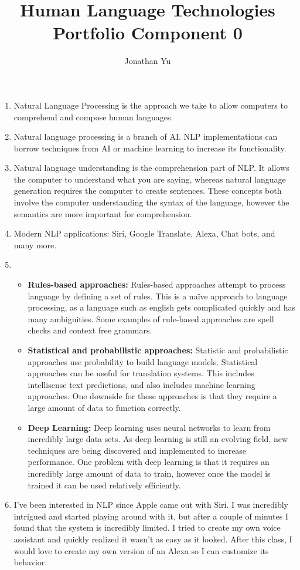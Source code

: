 \documentclass{article}
\title{Human Language Technologies Portfolio Component 0}
\author{Jonathan Yu}
\begin{document}
\renewcommand{\arraystretch}{1.5}
\maketitle
\begin{enumerate}[label=\alph*)]
	\item Natural Language Processing is the approach we take to allow computers to comprehend and compose human languages.

	\item Natural language processing is a branch of AI. NLP implementations can borrow techniques from AI or machine learning to increase its functionality.

	\item Natural language understanding is the comprehension part of NLP. It allows the computer to understand what you are saying, whereas natural language generation requires the computer to create sentences. These concepts both involve the computer understanding the syntax of the language, however the semantics are more important for comprehension.
	
	\item Modern NLP applications: Siri, Google Translate, Alexa, Chat bots, and many more.
	\item \begin{itemize}
		\item \textbf{Rules-based approaches:} Rules-based approaches attempt to process language by defining a set of rules. This is a na\"{i}ve approach to language processing, as a language such as english gets complicated quickly and has many ambiguities. Some examples of rule-based approaches are spell checks and context free grammars.

		\item \textbf{Statistical and probabilistic approaches:} Statistic and probabilistic approaches use probability to build language models. Statistical approaches can be useful for translation systems. This includes intellisense text predictions, and also includes machine learning approaches. One downside for these approaches is that they require a large amount of data to function correctly.

		\item \textbf{Deep Learning:} Deep learning uses neural networks to learn from incredibly large data sets. As deep learning is still an evolving field, new techniques are being discovered and implemented to increase performance. One problem with deep learning is that it requires an incredibly large amount of data to train, however once the model is trained it can be used relatively efficiently.

	\end{itemize}

	\item I've been interested in NLP since Apple came out with Siri. I was incredibly intrigued and started playing around with it, but after a couple of minutes I found that the system is incredibly limited. I tried to create my own voice assistant and quickly realized it wasn't as easy as it looked. After this class, I would love to create my own version of an Alexa so I can customize its behavior.
\end{enumerate}
\end{document}
